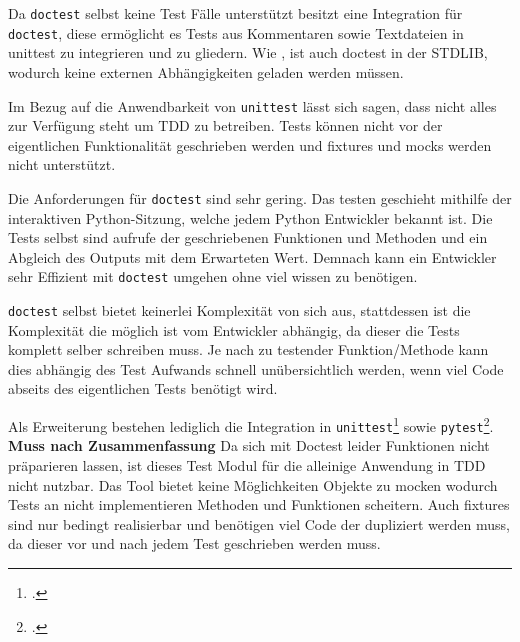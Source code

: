 Da \lstinline{doctest} selbst keine Test Fälle unterstützt besitzt
 eine Integration für \lstinline{doctest},
diese ermöglicht es Tests aus Kommentaren sowie Textdateien in unittest zu
integrieren und zu gliedern. Wie , ist auch
doctest in der STDLIB, wodurch keine externen Abhängigkeiten geladen werden
müssen.
\newline

Im Bezug auf die Anwendbarkeit von \lstinline{unittest} lässt sich sagen, dass
nicht alles zur Verfügung steht um TDD zu betreiben. Tests können nicht vor der
eigentlichen Funktionalität geschrieben werden und  \Glspl{fixture} und
\Glspl{mock} werden nicht unterstützt.

Die Anforderungen für \lstinline{doctest} sind sehr gering. Das testen geschieht
mithilfe der interaktiven Python-Sitzung, welche jedem Python Entwickler bekannt
ist. Die Tests selbst sind aufrufe der geschriebenen Funktionen und Methoden und
ein Abgleich des Outputs mit dem Erwarteten Wert. Demnach kann ein Entwickler
sehr Effizient mit \lstinline{doctest} umgehen ohne viel wissen zu benötigen.

\lstinline{doctest} selbst bietet keinerlei Komplexität von sich aus,
stattdessen ist die Komplexität die möglich ist vom Entwickler abhängig, da
dieser die Tests komplett selber schreiben muss. Je nach zu testender
Funktion/Methode kann dies abhängig des Test Aufwands schnell unübersichtlich
werden, wenn viel Code abseits des eigentlichen Tests benötigt wird.

Als Erweiterung bestehen lediglich die Integration in
\lstinline{unittest}\footcite{docs.python:doctest} sowie
\lstinline{pytest}\footcite{docs.pytest.org:4.4}.
\newline
\newline
\\
\textbf{Muss nach Zusammenfassung}
Da sich mit Doctest leider Funktionen nicht präparieren lassen, ist dieses
Test Modul für die alleinige Anwendung in TDD nicht nutzbar. Das Tool bietet
keine Möglichkeiten Objekte zu \gls{mock}en wodurch Tests an nicht
implementieren Methoden und Funktionen scheitern. Auch \Glspl{fixture} sind nur
bedingt realisierbar und benötigen viel Code der dupliziert werden muss, da
dieser vor und nach jedem Test geschrieben werden muss.